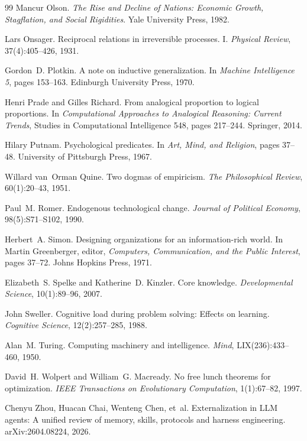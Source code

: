 \documentclass[11pt,a4paper]{article}
\theoremstyle{remark}
\begin{document}
\begin{thebibliography}{99}
Mancur Olson.
\newblock \emph{The Rise and Decline of Nations: Economic Growth, Stagflation, and Social Rigidities}.
\newblock Yale University Press, 1982.

Lars Onsager.
\newblock Reciprocal relations in irreversible processes. I.
\newblock \emph{Physical Review}, 37(4):405--426, 1931.

Gordon~D. Plotkin.
\newblock A note on inductive generalization.
\newblock In \emph{Machine Intelligence 5}, pages 153--163. Edinburgh University Press, 1970.

Henri Prade and Gilles Richard.
\newblock From analogical proportion to logical proportions.
\newblock In \emph{Computational Approaches to Analogical Reasoning: Current Trends}, Studies in
Computational Intelligence 548, pages 217--244. Springer, 2014.

Hilary Putnam.
\newblock Psychological predicates.
\newblock In \emph{Art, Mind, and Religion}, pages 37--48. University of Pittsburgh Press, 1967.

Willard van~Orman Quine.
\newblock Two dogmas of empiricism.
\newblock \emph{The Philosophical Review}, 60(1):20--43, 1951.

Paul~M. Romer.
\newblock Endogenous technological change.
\newblock \emph{Journal of Political Economy}, 98(5):S71--S102, 1990.

Herbert~A. Simon.
\newblock Designing organizations for an information-rich world.
\newblock In Martin Greenberger, editor, \emph{Computers, Communication, and the Public Interest}, pages 37--72. Johns Hopkins Press, 1971.

Elizabeth~S. Spelke and Katherine~D. Kinzler.
\newblock Core knowledge.
\newblock \emph{Developmental Science}, 10(1):89--96, 2007.

John Sweller.
\newblock Cognitive load during problem solving: Effects on learning.
\newblock \emph{Cognitive Science}, 12(2):257--285, 1988.

Alan~M. Turing.
\newblock Computing machinery and intelligence.
\newblock \emph{Mind}, LIX(236):433--460, 1950.

David~H. Wolpert and William~G. Macready.
\newblock No free lunch theorems for optimization.
\newblock \emph{IEEE Transactions on Evolutionary Computation}, 1(1):67--82, 1997.

Chenyu Zhou, Huacan Chai, Wenteng Chen, et~al.
\newblock Externalization in LLM agents: A unified review of memory, skills, protocols and harness engineering.
\newblock arXiv:2604.08224, 2026.

\end{thebibliography}
\end{document}
